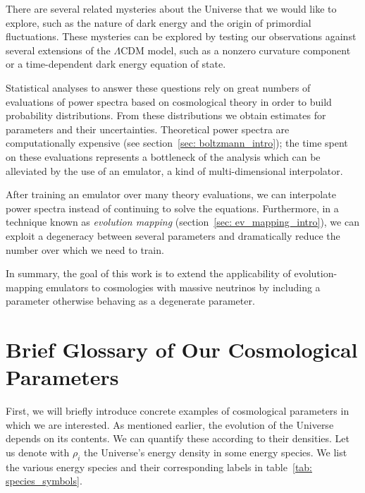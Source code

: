 There are several related mysteries about the Universe that we would like to
explore, such as the nature of dark energy and the origin of primordial
fluctuations. These mysteries can be explored by testing our observations
against several extensions of the $\Lambda$CDM model, such as a nonzero 
curvature component or a time-dependent dark energy equation of state. 

Statistical analyses to answer these questions rely on great numbers of
evaluations of power spectra based on cosmological theory in order to build 
probability 
distributions. From these distributions we obtain estimates for parameters and 
their
uncertainties. Theoretical power spectra are computationally expensive 
(see section~\ref{sec: boltzmann_intro}); the time spent on these evaluations
represents a bottleneck of the analysis which can be alleviated by the
use of an emulator, a kind of multi-dimensional interpolator.

After training an emulator over many theory evaluations, we can interpolate
power spectra instead of continuing to solve the equations. Furthermore, in
a technique known as \textit{evolution mapping}
(section~\ref{sec: ev_mapping_intro}), we can exploit a degeneracy between 
several parameters and dramatically reduce the number over which
we need to train. 

In summary, the goal of this work is to extend the applicability of
evolution-mapping emulators to cosmologies with massive neutrinos by
including a parameter otherwise behaving as a degenerate parameter. 

\section{Brief Glossary of Our Cosmological Parameters}
\label{sec: param_glossary}


First, we will briefly introduce concrete
examples of cosmological parameters in which we are interested. As mentioned earlier, the evolution of the Universe depends on its contents.
We can quantify these according to their densities. Let us denote with
$\rho_i$ the Universe's energy density in some energy species. We list the 
various energy species and their corresponding labels in
table~\ref{tab: species_symbols}.


